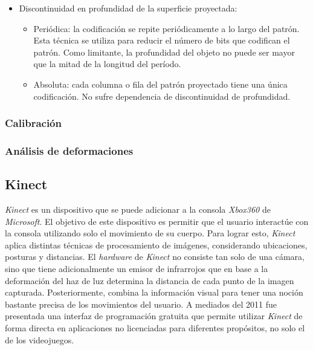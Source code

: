 \begin{itemize}
\begin{itemize}
   \end{itemize}
   \item Discontinuidad en profundidad de la superficie proyectada:
   \begin{itemize}
	\item Periódica: la codificación se repite periódicamente a lo largo del patrón. Esta técnica se utiliza para reducir el número de bits que codifican el patrón. Como limitante, la profundidad del objeto no puede ser mayor que la mitad de la longitud del período.%
	\item Absoluta: cada columna o fila del patrón proyectado tiene una única codificación. No sufre dependencia de discontinuidad de profundidad.
   \end{itemize}
\end{itemize}

\subsubsection{Calibración}

\subsubsection{Análisis de deformaciones}


\subsection{Kinect}

\emph{Kinect} es un dispositivo que se puede adicionar a la consola \emph{Xbox360} de \emph{Microsoft}. El objetivo de este dispositivo es permitir que el usuario interactúe con la consola utilizando solo el movimiento de su cuerpo. Para lograr esto, \emph{Kinect} aplica distintas técnicas de procesamiento de imágenes, considerando ubicaciones, posturas y distancias. El \emph{hardware} de \emph{Kinect} no consiste tan solo de una cámara, sino que tiene adicionalmente un emisor de infrarrojos que en base a la deformación del haz de luz determina la distancia de cada punto de la imagen capturada. Posteriormente, combina la información visual para tener una noción bastante precisa de los movimientos del usuario. A mediados del 2011 fue presentada una interfaz de programación gratuita que permite utilizar \emph{Kinect} de forma directa en aplicaciones no licenciadas para diferentes propósitos, no solo el de los videojuegos.

